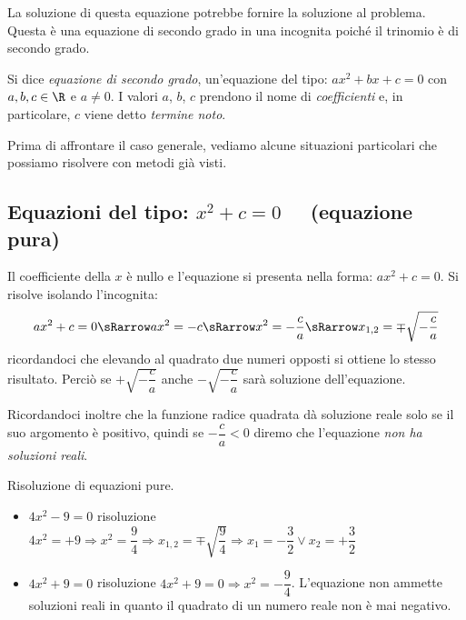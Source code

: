 La soluzione di questa equazione potrebbe fornire la soluzione al problema.
Questa è una equazione di secondo grado in una incognita poiché il trinomio è 
di secondo grado.
\begin{definizione}
Si dice \emph{equazione di secondo grado}, un'equazione del tipo: 
\(ax^2 +bx +c = 0\) con \(a, b, c \in \R\) e \(a \neq 0\). 
I valori \(a\), \(b\), \(c\) prendono il nome di \emph{coefficienti} e, in 
particolare, \(c\) viene detto \emph{termine noto}.
\end{definizione}


Prima di affrontare il caso generale, vediamo alcune situazioni particolari 
che possiamo risolvere con metodi già visti.

\subsection{Equazioni del tipo: \(x^2 +c = 0\)~~ (equazione pura)}
Il coefficiente della \(x\) è nullo e l'equazione si presenta nella forma: 
\(ax^2 +c = 0\).
Si risolve isolando l'incognita:
\[ax^2 +c = 0 \sRarrow ax^2 = -c \sRarrow x^2 = -\dfrac{c}{a} \sRarrow 
x_{1,2}=\mp \sqrt{-\dfrac{c}{a}}\]
ricordandoci che elevando al quadrato due numeri opposti si ottiene lo stesso 
risultato. 
Perciò se  \(+\sqrt{-\dfrac{c}{a}}\) anche \(-\sqrt{-\dfrac{c}{a}}\) sarà 
soluzione dell'equazione.

Ricordandoci inoltre che la funzione radice quadrata dà soluzione reale solo 
se il suo argomento è positivo, quindi se \quad \(-\dfrac{c}{a} < 0 \) \quad 
diremo che l'equazione \emph{non ha soluzioni reali}.

\begin{esempio}
 Risoluzione di equazioni pure.
\begin{itemize} [nosep]
\item \(4 x ^{2} -9 =0\) risoluzione
\(4x^2 = +9 \Rightarrow x^2 = \dfrac{9}{4}
\Rightarrow x_{1,2 } = \mp \sqrt{\dfrac{9}{4}} \Rightarrow 
x_1 = -\dfrac{3}{2} \vee x _2 = +\dfrac{3}{2}\)
\item \(4 x ^{2 } +9 = 0\) risoluzione \(4x^2 +9 = 0 \Rightarrow 
x^{2 } = -\dfrac{9}{4}\). 
L'equazione non ammette soluzioni reali in quanto il quadrato di un numero 
reale non è mai negativo.
\end{itemize}
\end{esempio}

